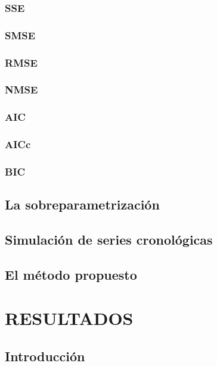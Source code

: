 \documentclass[
]{article}
\begin{document}
\subsubsection{SSE}

\subsubsection{SMSE}

\subsubsection{RMSE}

\subsubsection{NMSE}

\subsubsection{AIC}

\subsubsection{AICc}

\subsubsection{BIC}

\subsection{La sobreparametrización}

\subsection{Simulación de series cronológicas}

\subsection{El método propuesto}

\newpage

\section{RESULTADOS}

\subsection{Introducción}
\end{document}
